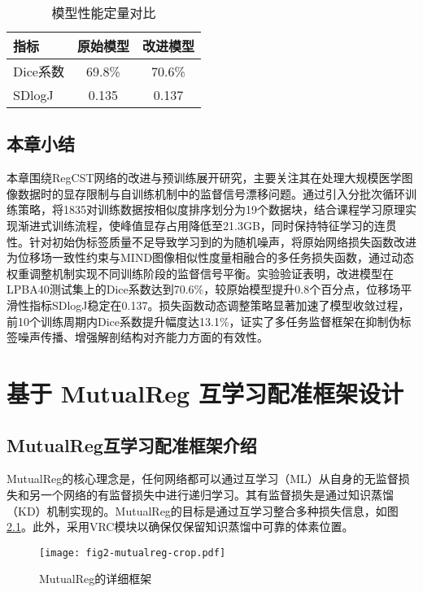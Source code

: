 \begin{table}[h]
    \centering
    \caption{模型性能定量对比}
    \label{tab:CSTresult}
    \begin{tabular}{lcc}
        \toprule
        \textbf{指标} & \textbf{原始模型} & \textbf{改进模型} \\
        \midrule
        Dice系数      & 69.8\%        & 70.6\%        \\
        SDlogJ      & 0.135         & 0.137         \\
        \bottomrule
    \end{tabular}
\end{table}

\section{本章小结}

本章围绕RegCST网络的改进与预训练展开研究，主要关注其在处理大规模医学图像数据时的显存限制与自训练机制中的监督信号漂移问题。通过引入分批次循环训练策略，将1835对训练数据按相似度排序划分为19个数据块，结合课程学习原理实现渐进式训练流程，使峰值显存占用降低至21.3GB，同时保持特征学习的连贯性。针对初始伪标签质量不足导致学习到的为随机噪声，将原始网络损失函数改进为位移场一致性约束与MIND图像相似性度量相融合的多任务损失函数，通过动态权重调整机制实现不同训练阶段的监督信号平衡。实验验证表明，改进模型在LPBA40测试集上的Dice系数达到70.6\%，较原始模型提升0.8个百分点，位移场平滑性指标SDlogJ稳定在0.137。损失函数动态调整策略显著加速了模型收敛过程，前10个训练周期内Dice系数提升幅度达13.1\%，证实了多任务监督框架在抑制伪标签噪声传播、增强解剖结构对齐能力方面的有效性。

\chapter{基于 MutualReg 互学习配准框架设计}

\section{MutualReg互学习配准框架介绍}

MutualReg的核心理念是，任何网络都可以通过互学习（ML）从自身的无监督损失和另一个网络的有监督损失中进行递归学习。其有监督损失是通过知识蒸馏（KD）机制实现的。MutualReg的目标是通过互学习整合多种损失信息，如图\ref{fig:2}。此外，采用VRC模块以确保仅保留知识蒸馏中可靠的体素位置。

\begin{figure}[h]
    \centering
    \texttt{[image: fig2-mutualreg-crop.pdf]}
    \caption{MutualReg的详细框架}
    \label{fig:2}
\end{figure}

